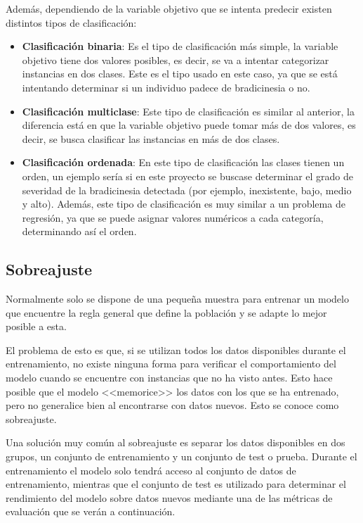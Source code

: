 Además, dependiendo de la variable objetivo que se intenta predecir existen
distintos tipos de clasificación:

\begin{itemize}
    \item \textbf{Clasificación binaria}: Es el tipo de clasificación más
    simple, la variable objetivo tiene dos valores posibles, es decir, se va a
    intentar categorizar instancias en dos clases. Este es el tipo usado en este
    caso, ya que se está intentando determinar si un individuo padece de
    bradicinesia o no.
    \item \textbf{Clasificación multiclase}: Este tipo de clasificación es
    similar al anterior, la diferencia está en que la variable objetivo puede
    tomar más de dos valores, es decir, se busca clasificar las instancias en
    más de dos clases.
    \item \textbf{Clasificación ordenada}: En este tipo de clasificación las
    clases tienen un orden, un ejemplo sería si en este proyecto se buscase
    determinar el grado de severidad de la bradicinesia detectada (por ejemplo,
    inexistente, bajo, medio y alto). Además, este tipo de clasificación es muy
    similar a un problema de regresión, ya que se puede asignar valores
    numéricos a cada categoría, determinando así el orden.
\end{itemize}

\subsection{Sobreajuste}

Normalmente solo se dispone de una pequeña muestra para entrenar un modelo que
encuentre la regla general que define la población y se adapte lo mejor posible
a esta.

El problema de esto es que, si se utilizan todos los datos disponibles durante
el entrenamiento, no existe ninguna forma para verificar el comportamiento del
modelo cuando se encuentre con instancias que no ha visto antes. Esto hace
posible que el modelo <<memorice>> los datos con los que se ha entrenado, pero
no generalice bien al encontrarse con datos nuevos. Esto se conoce como
sobreajuste.

Una solución muy común al sobreajuste es separar los datos disponibles en dos
grupos, un conjunto de entrenamiento y un conjunto de test o prueba. Durante el
entrenamiento el modelo solo tendrá acceso al conjunto de datos de
entrenamiento, mientras que el conjunto de test es utilizado para determinar el
rendimiento del modelo sobre datos nuevos mediante una de las métricas de
evaluación que se verán a continuación.

